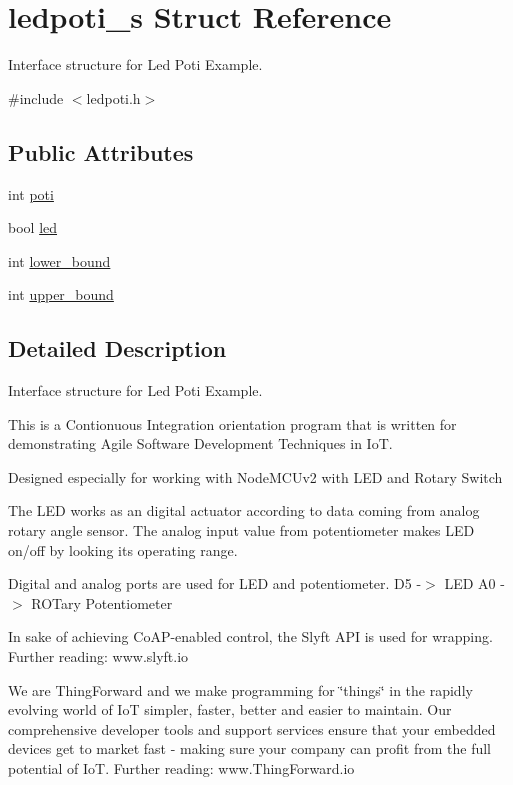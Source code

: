 \hypertarget{structledpoti__s}{}\section{ledpoti\+\_\+s Struct Reference}
\label{structledpoti__s}


Interface structure for Led Poti Example.  




{\ttfamily \#include $<$ledpoti.\+h$>$}

\subsection*{Public Attributes}
\begin{DoxyCompactItemize}
\item 
int \hyperlink{structledpoti__s_a68de5489c63aee62e5da18f9b4fe6fa9}{poti}
\item 
bool \hyperlink{structledpoti__s_a323939ea414113ee4c4ab2459c593886}{led}
\item 
int \hyperlink{structledpoti__s_a877ef064792684db1fe8ca3b9af45897}{lower\+\_\+bound}
\item 
int \hyperlink{structledpoti__s_a13828b9c632c6ad2497be31aeeaa991b}{upper\+\_\+bound}
\end{DoxyCompactItemize}


\subsection{Detailed Description}
Interface structure for Led Poti Example. 

This is a Contionuous Integration orientation program that is written for demonstrating Agile Software Development Techniques in IoT.

Designed especially for working with Node\+M\+C\+Uv2 with L\+ED and Rotary Switch

The L\+ED works as an digital actuator according to data coming from analog rotary angle sensor. The analog input value from potentiometer makes L\+ED on/off by looking its operating range.

Digital and analog ports are used for L\+ED and potentiometer. D5 -\/$>$ L\+ED A0 -\/$>$ R\+O\+Tary Potentiometer

In sake of achieving Co\+A\+P-\/enabled control, the Slyft A\+PI is used for wrapping. Further reading\+: www.\+slyft.\+io

We are Thing\+Forward and we make programming for \char`\"{}things\char`\"{} in the rapidly evolving world of IoT simpler, faster, better and easier to maintain. Our comprehensive developer tools and support services ensure that your embedded devices get to market fast -\/ making sure your company can profit from the full potential of IoT. Further reading\+: www.\+Thing\+Forward.\+io

